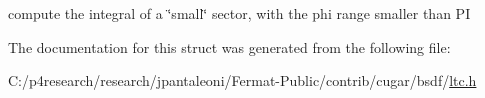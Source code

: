 compute the integral of a \char`\"{}small\char`\"{} sector, with the phi range smaller than PI 

The documentation for this struct was generated from the following file\+:\begin{DoxyCompactItemize}
\item 
C\+:/p4research/research/jpantaleoni/\+Fermat-\/\+Public/contrib/cugar/bsdf/\hyperlink{ltc_8h}{ltc.\+h}\end{DoxyCompactItemize}
